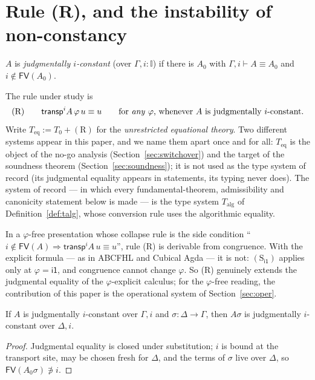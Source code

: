 \documentclass{lmcs}
\newcommand{\I}{\mathbb{I}}
\newcommand{\transp}{\mathsf{transp}}
\newcommand{\FV}{\mathsf{FV}}
\renewcommand{\conv}{\equiv}
\newcommand{\ii}{\mathsf{i1}}
\begin{document}
\section{Rule (R), and the instability of non-constancy}
\label{sec:rule}

\begin{defi}\label{def:const}
  $A$ is \emph{judgmentally $i$-constant} (over $\Gamma, i : \I$) if
  there is $A_0$ with $\Gamma, i \vdash A \conv A_0$ and
  $i \notin \FV(A_0)$.
\end{defi}

\noindent The rule under study is
\[
  (\mathrm{R})\qquad
  \transp^i A\,\varphi\,u \conv u
  \qquad\text{for \emph{any} $\varphi$, whenever $A$ is judgmentally
  $i$-constant.}
\]
Write $T_{\mathrm{eq}} := T_0 + (\mathrm{R})$ for the
\emph{unrestricted equational theory}.  Two different systems appear
in this paper, and we name them apart once and for all:
$T_{\mathrm{eq}}$ is the object of the no-go analysis
(Section~\ref{sec:switchover}) and the target of the soundness
theorem (Section~\ref{sec:soundness}); it is not used as the type
system of record (its judgmental equality appears in statements, its
typing never does).
The system of record --- in which every fundamental-theorem,
admissibility and canonicity statement below is made --- is the type
system $T_{\mathrm{alg}}$ of Definition~\ref{def:talg}, whose
conversion rule uses the algorithmic equality.

\begin{rem}\label{rem:explicit}
  In a $\varphi$-free presentation whose collapse rule is the side
  condition ``$i \notin \FV(A) \Rightarrow \transp^i A\,u \conv u$'',
  rule (R) is derivable from congruence.  With the explicit formula
  --- as in ABCFHL and Cubical Agda --- it is not:
  $(\mathrm{S}_{\ii})$ applies only at $\varphi = \ii$, and
  congruence cannot change $\varphi$.  So (R) genuinely extends the
  judgmental equality of the $\varphi$-explicit calculus; for the
  $\varphi$-free reading, the contribution of this paper is the
  operational system of Section~\ref{sec:oper}.
\end{rem}

\begin{lem}\label{lem:posstab}
  If $A$ is judgmentally $i$-constant over $\Gamma, i$ and
  $\sigma : \Delta \to \Gamma$, then $A\sigma$ is judgmentally
  $i$-constant over $\Delta, i$.
\end{lem}
\begin{proof}
  Judgmental equality is closed under substitution; $i$ is bound at
  the transport site, may be chosen fresh for $\Delta$, and the terms
  of $\sigma$ live over $\Delta$, so $\FV(A_0\sigma) \not\ni i$.
\end{proof}
\end{document}
